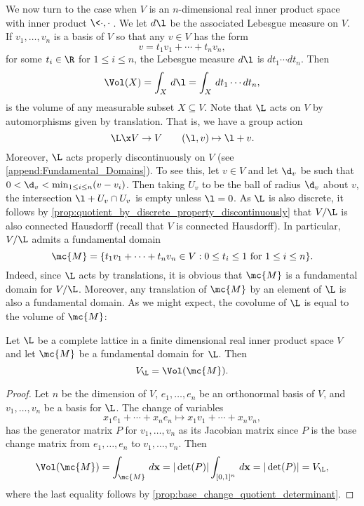     We now turn to the case when $V$ is an $n$-dimensional real inner product space with inner product $\<\cdot,\cdot\>$. We let $d\l$ be the associated Lebesgue measure on $V$. If $v_{1},\ldots,v_{n}$ is a basis of $V$ so that any $v \in V$ has the form
    \[
      v = t_{1}v_{1}+\cdots+t_{n}v_{n},
    \]
    for some $t_{i} \in \R$ for $1 \le i \le n$, the Lebesgue measure $d\l$ is $dt_{1} \cdots dt_{n}$. Then
    \[
      \Vol(X) = \int_{X}\,d\l = \int_{X}\,dt_{1} \cdots dt_{n},
    \]
    is the volume of any measurable subset $X \subseteq V$. Note that $\L$ acts on $V$ by automorphisms given by translation. That is, we have a group action
    \[
      \L \x V \to V \qquad (\l,v) \mapsto \l+v.
    \]
    Moreover, $\L$ acts properly discontinuously on $V$ (see \cref{append:Fundamental_Domains}). To see this, let $v \in V$ and let $\d_{v}$ be such that $0 < \d_{v} < \min_{1 \le i \le n}(v-v_{i})$. Then taking $U_{v}$ to be the ball of radius $\d_{v}$ about $v$, the intersection $\l+U_{v} \cap U_{v}$ is empty unless $\l = 0$. As $\L$ is also discrete, it follows by \cref{prop:quotient_by_discrete_property_discontinuously} that $V/\L$ is also connected Hausdorff (recall that $V$ is connected Hausdorff). In particular, $V/\L$ admits a fundamental domain
    \[
      \mc{M} = \{t_{1}v_{1}+\cdots+t_{n}v_{n} \in V:\text{$0 \le t_{i} \le 1$ for $1 \le i \le n$}\}.
    \]
    Indeed, since $\L$ acts by translations, it is obvious that $\mc{M}$ is a fundamental domain for $V/\L$. Moreover, any translation of $\mc{M}$ by an element of $\L$ is also a fundamental domain. As we might expect, the covolume of $\L$ is equal to the volume of $\mc{M}$:

    \begin{proposition}\label{prop:covolume_equals_volume_of_fundamental_domain}
      Let $\L$ be a complete lattice in a finite dimensional real inner product space $V$ and let $\mc{M}$ be a fundamental domain for $\L$. Then
      \[
        V_{\L} = \Vol(\mc{M}).
      \]
    \end{proposition}
    \begin{proof}
      Let $n$ be the dimension of $V$, $e_{1},\ldots,e_{n}$ be an orthonormal basis of $V$, and $v_{1},\ldots,v_{n}$ be a basis for $\L$. The change of variables
      \[
        x_{1}e_{1}+\cdots+x_{n}e_{n} \mapsto x_{1}v_{1}+\cdots+x_{n}v_{n},
      \]
      has the generator matrix $P$ for $v_{1},\ldots,v_{n}$ as its Jacobian matrix since $P$ is the base change matrix from $e_{1},\ldots,e_{n}$ to $v_{1},\ldots,v_{n}$. Then
      \[
        \Vol(\mc{M}) = \int_{\mc{M}}\,d\mathbf{x} = |\det(P)|\int_{[0,1]^{n}}\,d\mathbf{x} = |\det(P)| = V_{\L},
      \]
      where the last equality follows by \cref{prop:base_change_quotient_determinant}.
    \end{proof}

